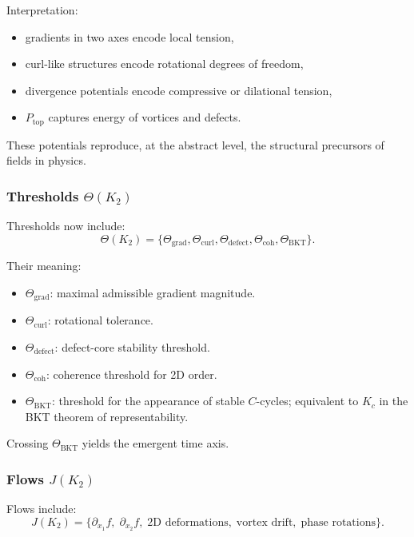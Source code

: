 Interpretation:
\begin{itemize}
    \item gradients in two axes encode local tension,
    \item curl-like structures encode rotational degrees of freedom,
    \item divergence potentials encode compressive or dilational tension,
    \item $P_{\mathrm{top}}$ captures energy of vortices and defects.
\end{itemize}

These potentials reproduce, at the abstract level, the structural
precursors of fields in physics.

\subsubsection{Thresholds \texorpdfstring{$\Theta(K_2)$}{\Theta(K_2)}}

Thresholds now include:
\[
\Theta(K_2) =
\{\Theta_{\mathrm{grad}}, \Theta_{\mathrm{curl}},
  \Theta_{\mathrm{defect}}, \Theta_{\mathrm{coh}},
  \Theta_{\mathrm{BKT}}\}.
\]

Their meaning:
\begin{itemize}
    \item $\Theta_{\mathrm{grad}}$: maximal admissible gradient magnitude.
    \item $\Theta_{\mathrm{curl}}$: rotational tolerance.
    \item $\Theta_{\mathrm{defect}}$: defect-core stability threshold.
    \item $\Theta_{\mathrm{coh}}$: coherence threshold for 2D order.
    \item $\Theta_{\mathrm{BKT}}$: threshold for the appearance of
          stable $C$-cycles; equivalent to $K_c$ in the BKT theorem of
          representability.
\end{itemize}

Crossing $\Theta_{\mathrm{BKT}}$ yields the emergent time axis.

\subsubsection{Flows \texorpdfstring{$J(K_2)$}{J(K_2)}}

Flows include:
\[
J(K_2) = \{\partial_{x_1} f,\; \partial_{x_2} f,\;
\text{2D deformations},\; \text{vortex drift},\; \text{phase rotations}\}.
\]

